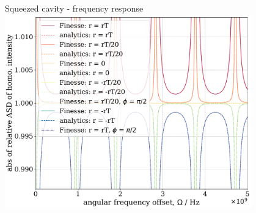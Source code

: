 \documentclass[12pt]{beamer}
\begin{document}
\begin{frame}[noframenumbering]{Squeezed cavity - frequency response}
\centering
\includegraphics[width=0.8\textwidth]{figures/squeezed_cavity_relative_qhd_vs_freq_comparison.pdf}
\end{frame}

\end{document}
